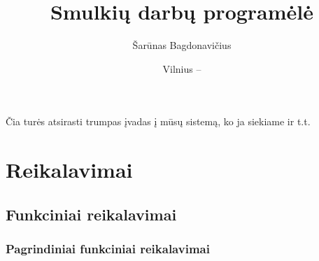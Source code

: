 \documentclass{VUMIFPSbakalaurinis}
\title{Smulkių darbų programėlė}
\author{Šarūnas Bagdonavičius}
\date{Vilnius – \the\year}
\begin{document}
\maketitle
\tableofcontents

Čia turės atsirasti trumpas įvadas į mūsų sistemą, ko ja siekiame ir t.t.

\section{Reikalavimai}
\subsection{Funkciniai reikalavimai}

\subsubsection{Pagrindiniai funkciniai reikalavimai}
\end{document}
